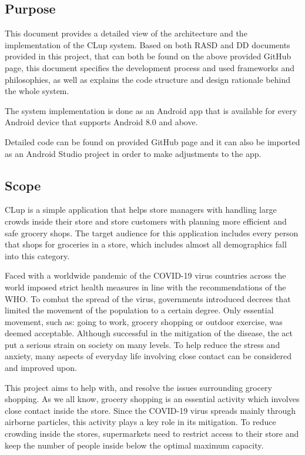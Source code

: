 \subsection{Purpose}
\hspace{\parindent}This document provides a detailed view of the architecture and the implementation of the CLup system. Based on both RASD and DD documents provided in this project, that can both be found on the above provided GitHub page, this document specifies the development process and used frameworks and philosophies, as well as explains the code structure and design rationale behind the whole system.

The system implementation is done as an Android app that is available for every Android device that supports Android 8.0 and above. 

Detailed code can be found on provided GitHub page and it can also be imported as an Android Studio project in order to make adjustments to the app.


\newpage

\subsection{Scope}
\hspace{\parindent}CLup is a simple application that helps store managers with handling large crowds inside their store and store customers with planning more efficient and safe grocery shops. The target audience for this application includes every person that shops for groceries in a store, which includes almost all demographics fall into this category. 

Faced with a worldwide pandemic of the COVID-19 virus countries across the world imposed strict health measures in line with the recommendations of the WHO. To combat the spread of the virus, governments introduced decrees that limited the movement of the population to a certain degree. Only essential movement, such as: going to work, grocery shopping or outdoor exercise, was deemed acceptable. Although successful in the mitigation of the disease, the act put a serious strain on society on many levels. To help reduce the stress and anxiety, many aspects of everyday life involving close contact can be considered and improved upon. 

This project aims to help with, and resolve the issues surrounding grocery shopping. As we all know, grocery shopping is an essential activity which involves close contact inside the store. Since the COVID-19 virus spreads mainly through airborne particles, this activity plays a key role in its mitigation. To reduce crowding inside the stores, supermarkets need to restrict access to their store and keep the number of people inside below the optimal maximum capacity. 

